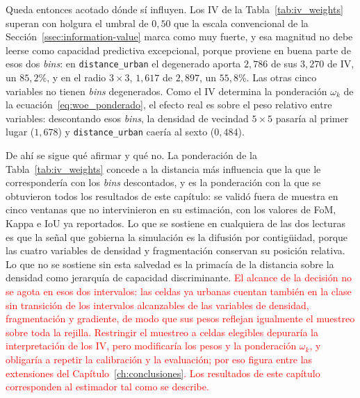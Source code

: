 Queda entonces acotado dónde sí influyen. Los IV de la Tabla~\ref{tab:iv_weights} superan con holgura el umbral de $0{,}50$ que la escala convencional de la Sección~\ref{ssec:information-value} marca como muy fuerte, y esa magnitud no debe leerse como capacidad predictiva excepcional, porque proviene en buena parte de esos dos \textit{bins}: en \texttt{distance\_urban} el degenerado aporta $2{,}786$ de sus $3{,}270$ de IV, un $85{,}2$\%, y en el radio $3\times3$, $1{,}617$ de $2{,}897$, un $55{,}8$\%. Las otras cinco variables no tienen \textit{bins} degenerados. Como el IV determina la ponderación $\omega_k$ de la ecuación~\ref{eq:woe_ponderado}, el efecto real es sobre el peso relativo entre variables: descontando esos \textit{bins}, la densidad de vecindad $5\times5$ pasaría al primer lugar ($1{,}678$) y \texttt{distance\_urban} caería al sexto ($0{,}484$).

De ahí se sigue qué afirmar y qué no. La ponderación de la Tabla~\ref{tab:iv_weights} concede a la distancia más influencia que la que le correspondería con los \textit{bins} descontados, y es la ponderación con la que se obtuvieron todos los resultados de este capítulo: se validó fuera de muestra en cinco ventanas que no intervinieron en su estimación, con los valores de FoM, Kappa e IoU ya reportados. Lo que se sostiene en cualquiera de las dos lecturas es que la señal que gobierna la simulación es la difusión por contigüidad, porque las cuatro variables de densidad y fragmentación conservan su posición relativa. Lo que no se sostiene sin esta salvedad es la primacía de la distancia sobre la densidad como jerarquía de capacidad discriminante. \textcolor{red}{El alcance de la decisión no se agota en esos dos intervalos: las celdas ya urbanas cuentan también en la clase sin transición de los intervalos alcanzables de las variables de densidad, fragmentación y gradiente, de modo que sus pesos reflejan igualmente el muestreo sobre toda la rejilla. Restringir el muestreo a celdas elegibles depuraría la interpretación de los IV, pero modificaría los pesos y la ponderación $\omega_k$, y obligaría a repetir la calibración y la evaluación; por eso figura entre las extensiones del Capítulo~\ref{ch:conclusiones}. Los resultados de este capítulo corresponden al estimador tal como se describe.}

